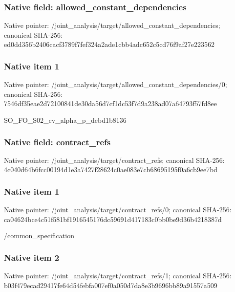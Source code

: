 \documentclass[10pt,a4paper]{article}
\begin{document}
\subsubsection{Native field: allowed\_constant\_dependencies}


Native pointer: /joint\_analysis/target/a\allowbreak{}llowed\_constant\_dependen\allowbreak{}cies; canonical SHA-256: ed0dd356b2406cacf3789f7f\allowbreak{}ef324a2ade1cbb4adc652c5c\allowbreak{}d76f9af27e223562



\subsubsection{Native item 1}


Native pointer: /joint\_analysis/target/a\allowbreak{}llowed\_constant\_dependen\allowbreak{}cies/0; canonical SHA-256: 7546df35eae2d72100841de3\allowbreak{}0da56d7cf1dc53f7d9a238ad\allowbreak{}07a64793f57fd8ee


SO\_FO\_S02\_cv\_alpha\_p\_debd1b8136


\subsubsection{Native field: contract\_refs}


Native pointer: /joint\_analysis/target/contract\_refs; canonical SHA-256: 4c040d64b6fcc00194d1e3a7\allowbreak{}427f28624c0ae083e7cb6869\allowbreak{}5195f0a6cb9ee7bd



\subsubsection{Native item 1}


Native pointer: /joint\_analysis/target/contract\_refs/0; canonical SHA-256: ca04624bce4c51f581bf1916\allowbreak{}545176dc59691d417183c0bb\allowbreak{}0be9d36b4218387d


/common\_specification


\subsubsection{Native item 2}


Native pointer: /joint\_analysis/target/contract\_refs/1; canonical SHA-256: b03f479ecad29417fe64d54f\allowbreak{}ebfa007ef0a050d7da8e3b96\allowbreak{}96bb89a91557a509
\end{document}
